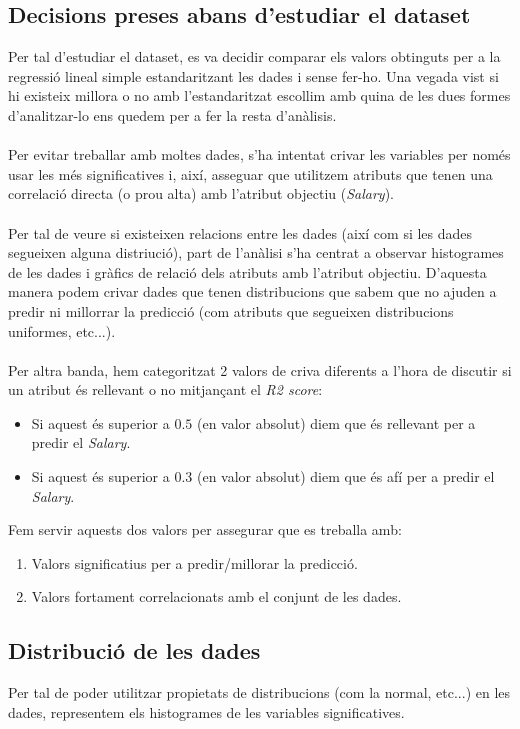 \documentclass[a4paper, 11pt]{article}
\begin{document}
\subsection{Decisions preses abans d'estudiar el dataset}
Per tal d'estudiar el dataset, es va decidir comparar els valors obtinguts per a la regressió lineal simple estandaritzant les dades i sense fer-ho. Una vegada vist si hi existeix millora o no amb l'estandaritzat escollim amb quina de les dues formes d'analitzar-lo ens quedem per a fer la resta d'anàlisis. \\\\
Per evitar treballar amb moltes dades, s'ha intentat crivar les variables per només usar les més significatives i, així, asseguar que utilitzem atributs que tenen una correlació directa (o prou alta) amb l'atribut objectiu (\textit{Salary}). \\\\
Per tal de veure si existeixen relacions entre les dades (així com si les dades segueixen alguna distriució), part de l'anàlisi s'ha centrat a observar histogrames de les dades i gràfics de relació dels atributs amb l'atribut objectiu. D'aquesta manera podem crivar dades que tenen distribucions que sabem que no ajuden a predir ni millorrar la predicció (com atributs que segueixen distribucions uniformes, etc...).\\\\
Per altra banda, hem categoritzat 2 valors de criva diferents a l'hora de discutir si un atribut és rellevant o no mitjançant el \textit{R2 score}:
\begin{itemize}
    \item Si aquest és superior a $0.5$ (en valor absolut) diem que és rellevant per a predir el \textit{Salary}. 
    \item Si aquest és superior a $0.3$ (en valor absolut) diem que és afí per a predir el \textit{Salary}.
\end{itemize}
Fem servir aquests dos valors per assegurar que es treballa amb:
\begin{enumerate}
    \item Valors significatius per a predir/millorar la predicció.
    \item Valors fortament correlacionats amb el conjunt de les dades.
\end{enumerate}

\newpage
\subsection{Distribució de les dades}\label{distribucions}
Per tal de poder utilitzar propietats de distribucions (com la normal, etc...) en les dades, representem els histogrames de les variables significatives.
\end{document}
